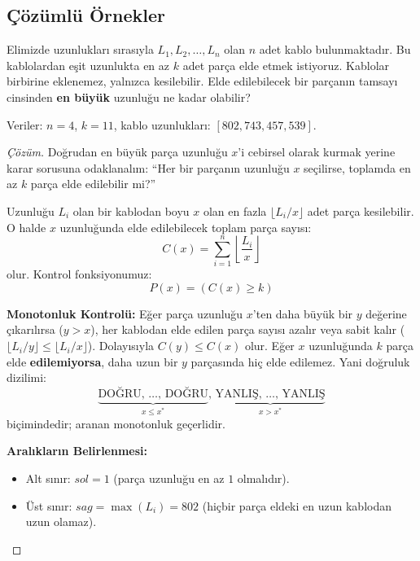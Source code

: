 \subsection{Çözümlü Örnekler}

\begin{example}
Elimizde uzunlukları sırasıyla $L_1, L_2, \dots, L_n$ olan $n$ adet kablo bulunmaktadır. Bu kablolardan eşit uzunlukta en az $k$ adet parça elde etmek istiyoruz. Kablolar birbirine eklenemez, yalnızca kesilebilir. Elde edilebilecek bir parçanın tamsayı cinsinden \textbf{en büyük} uzunluğu ne kadar olabilir?

Veriler: $n = 4$, $k = 11$, kablo uzunlukları: $[802, 743, 457, 539]$.
\end{example}

\begin{proof}[Çözüm]
Doğrudan en büyük parça uzunluğu $x$'i cebirsel olarak kurmak yerine karar sorusuna odaklanalım:
``Her bir parçanın uzunluğu $x$ seçilirse, toplamda en az $k$ parça elde edilebilir mi?''

Uzunluğu $L_i$ olan bir kablodan boyu $x$ olan en fazla $\lfloor L_i / x \rfloor$ adet parça kesilebilir.
O halde $x$ uzunluğunda elde edilebilecek toplam parça sayısı:
\[ C(x) = \sum_{i=1}^n \left\lfloor \frac{L_i}{x} \right\rfloor \]
olur. Kontrol fonksiyonumuz:
\[ P(x) = (C(x) \ge k) \]

\textbf{Monotonluk Kontrolü:}
Eğer parça uzunluğu $x$'ten daha büyük bir $y$ değerine çıkarılırsa ($y > x$), her kablodan elde edilen parça sayısı azalır veya sabit kalır ($\lfloor L_i / y \rfloor \le \lfloor L_i / x \rfloor$). Dolayısıyla $C(y) \le C(x)$ olur.
Eğer $x$ uzunluğunda $k$ parça elde \textbf{edilemiyorsa}, daha uzun bir $y$ parçasında hiç elde edilemez.
Yani doğruluk dizilimi:
\[ \underbrace{\text{DO\u{G}RU}, \, \dots, \, \text{DO\u{G}RU}}_{x \le x^*}, \, \underbrace{\text{YANLI\c{S}}, \, \dots, \, \text{YANLI\c{S}}}_{x > x^*} \]
biçimindedir; aranan monotonluk geçerlidir.

\textbf{Aralıkların Belirlenmesi:}
\begin{itemize}
    \item Alt sınır: $sol = 1$ (parça uzunluğu en az $1$ olmalıdır).
    \item Üst sınır: $sag = \max(L_i) = 802$ (hiçbir parça eldeki en uzun kablodan uzun olamaz).
\end{itemize}


\end{proof}
